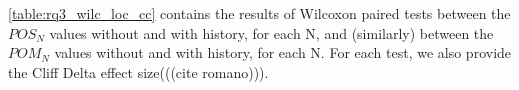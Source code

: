 \autoref{table:rq3_wilc_loc_cc} contains the results of Wilcoxon paired tests between the $POS_N$ values without and with history, for each N, and (similarly) between the $POM_N$ values without and with history, for each N. For each test, we also provide the Cliff Delta effect size(((cite romano))).%











